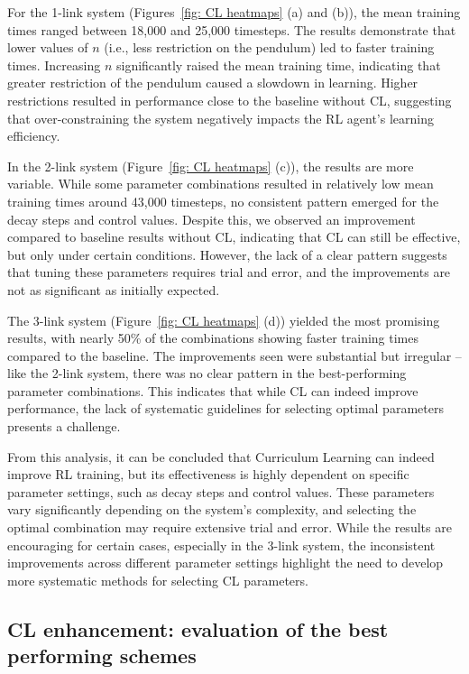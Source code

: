 For the 1-link system (Figures~\ref{fig: CL heatmaps} (a) and (b)), the mean training times ranged between 18,000 and 25,000 timesteps. The results demonstrate that lower values of \(n\) (i.e., less restriction on the pendulum) led to faster training times. Increasing \(n\) significantly raised the mean training time, indicating that greater restriction of the pendulum caused a slowdown in learning. Higher restrictions resulted in performance close to the baseline without CL, suggesting that over-constraining the system negatively impacts the RL agent's learning efficiency.

In the 2-link system (Figure~\ref{fig: CL heatmaps} (c)), the results are more variable. While some parameter combinations resulted in relatively low mean training times around 43,000 timesteps, no consistent pattern emerged for the decay steps and control values. Despite this, we observed an improvement compared to baseline results without CL, indicating that CL can still be effective, but only under certain conditions. However, the lack of a clear pattern suggests that tuning these parameters requires trial and error, and the improvements are not as significant as initially expected.

The 3-link system (Figure~\ref{fig: CL heatmaps} (d)) yielded the most promising results, with nearly 50\% of the combinations showing faster training times compared to the baseline. The improvements seen were substantial but irregular -- like the 2-link system, there was no clear pattern in the best-performing parameter combinations. This indicates that while CL can indeed improve performance, the lack of systematic guidelines for selecting optimal parameters presents a challenge.

From this analysis, it can be concluded that Curriculum Learning can indeed improve RL training, but its effectiveness is highly dependent on specific parameter settings, such as decay steps and control values. These parameters vary significantly depending on the system's complexity, and selecting the optimal combination may require extensive trial and error. While the results are encouraging for certain cases, especially in the 3-link system, the inconsistent improvements across different parameter settings highlight the need to develop more systematic methods for selecting CL parameters.

\subsection{CL enhancement: evaluation of the best performing schemes}

